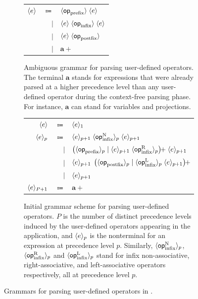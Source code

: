 \begin{figure}[H]
\begin{subfigure}{\linewidth}
\centering
\begin{tabular}{rrl}
$ \langle e\rangle $ & $ \Coloneqq $ & $ \langle\mathsf{op}_{\text{prefix}}\rangle \; \langle e\rangle $\\
& $ \mid $ & $ \langle e\rangle \; \langle\mathsf{op}_{\text{infix}}\rangle \; \langle e\rangle $\\
& $ \mid $ & $ \langle e\rangle \; \langle\mathsf{op}_{\text{postfix}}\rangle $\\
& $ \mid $ & $ \mathbf{a}+ $
\end{tabular}
\caption{Ambiguous grammar for parsing user-defined operators. The terminal $ \mathbf{a} $ stands for expressions that were already parsed at a higher precedence level than any user-defined operator during the context-free parsing phase.
For instance, $ \mathbf{a} $ can stand for variables and projections.}
\label{figure:user-defined-operators-initial-grammar}
\end{subfigure}
\par\bigskip
\begin{subfigure}{\linewidth}
\centering
\begin{tabular}{rrl}
$ \langle e\rangle $ & $ \Coloneqq $ & $ \langle e\rangle_1 $\\
$ \langle e\rangle_p $ & $ \Coloneqq $ & $ \langle e\rangle_{p + 1} \; \langle\mathsf{op}_{\text{infix}}^\text{N}\rangle_p \; \langle e\rangle_{p + 1} $\\
& $ \mid $ & $ \left(\langle\mathsf{op}_{\text{prefix}}\rangle_p \mid \langle e\rangle_{p + 1} \; \langle\mathsf{op}_{\text{infix}}^\text{R}\rangle_p\right)\hspace{-0.3em}{+} \; \langle e\rangle_{p + 1} $\\
& $ \mid $ & $ \langle e\rangle_{p + 1} \; \left(\langle\mathsf{op}_{\text{postfix}}\rangle_p \mid \langle\mathsf{op}_{\text{infix}}^\text{L}\rangle_p \; \langle e\rangle_{p + 1}\right)\hspace{-0.3em}{+} $\\
& $ \mid $ & $ \langle e\rangle_{p + 1} $\\
$ \langle e\rangle_{P + 1} $ & $ \Coloneqq $ & $ \mathbf{a}+ $
\end{tabular}
\caption{%
Initial grammar scheme for parsing user-defined operators.
$ P $ is the number of distinct precedence levels induced by the user-defined operators appearing in the application, and $ \langle e\rangle_p $ is the nonterminal for an expression at precedence level $ p $.
Similarly, $ \langle\mathsf{op}_{\text{infix}}^\text{N}\rangle_p $, $ \langle\mathsf{op}_{\text{infix}}^\text{R}\rangle_p $ and $ \langle\mathsf{op}_{\text{infix}}^\text{L}\rangle_p $ stand for infix non-associative, right-associative, and left-associative operators respectively, all at precedence level $ p $.
}
\label{figure:user-defined-operators-initial-grammar-scheme}
\end{subfigure}
\caption[Grammars for parsing user-defined operators in \Beluga]{Grammars for parsing user-defined operators in \Beluga.}
\label{figure:user-defined-operators-grammar}
\end{figure}%
